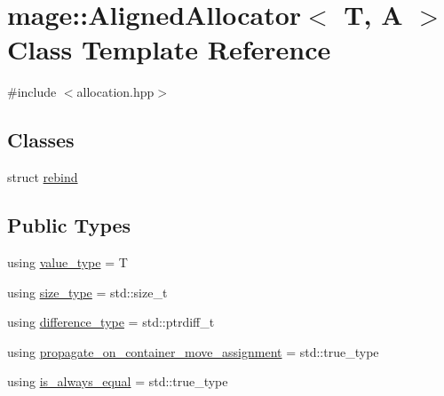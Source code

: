 \hypertarget{classmage_1_1_aligned_allocator}{}\section{mage\+:\+:Aligned\+Allocator$<$ T, A $>$ Class Template Reference}
\label{classmage_1_1_aligned_allocator}


{\ttfamily \#include $<$allocation.\+hpp$>$}

\subsection*{Classes}
\begin{DoxyCompactItemize}
\item 
struct \mbox{\hyperlink{structmage_1_1_aligned_allocator_1_1rebind}{rebind}}
\end{DoxyCompactItemize}
\subsection*{Public Types}
\begin{DoxyCompactItemize}
\item 
using \mbox{\hyperlink{classmage_1_1_aligned_allocator_a9e7c440f52f940161bd6cbf1b3c1d21c}{value\+\_\+type}} = T
\item 
using \mbox{\hyperlink{classmage_1_1_aligned_allocator_aa391d44543b39d7f35e3aef16d9c1846}{size\+\_\+type}} = std\+::size\+\_\+t
\item 
using \mbox{\hyperlink{classmage_1_1_aligned_allocator_a02c62745f0f0414eea74f3393b1710f7}{difference\+\_\+type}} = std\+::ptrdiff\+\_\+t
\item 
using \mbox{\hyperlink{classmage_1_1_aligned_allocator_a810022ca5c53154ee0903a8f236b3395}{propagate\+\_\+on\+\_\+container\+\_\+move\+\_\+assignment}} = std\+::true\+\_\+type
\item 
using \mbox{\hyperlink{classmage_1_1_aligned_allocator_a144fbbf7d538636d83b3eb45965af6bf}{is\+\_\+always\+\_\+equal}} = std\+::true\+\_\+type
\end{DoxyCompactItemize}
